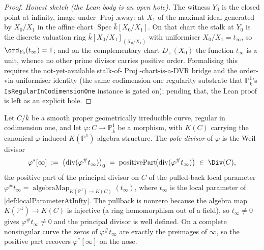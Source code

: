 \begin{proof}
  \emph{Honest sketch (the Lean body is an open hole).} The witness \(Y_0\) is
  the closed point at infinity, image under \(\operatorname{Proj}.\mathrm{aw\!ay\iota}\)
  at \(X_1\) of the maximal ideal generated by \(X_0/X_1\) in the affine chart
  \(\operatorname{Spec} \bar k[X_0/X_1]\). On that chart the stalk at \(Y_0\) is
  the discrete valuation ring \(\bar k[X_0/X_1]_{(X_0/X_1)}\) with uniformiser
  \(X_0/X_1 = t_\infty\), so \(\ord_{Y_0}(t_\infty) = 1\); and on the
  complementary chart \(D_+(X_0)\) the function \(t_\infty\) is a unit, whence
  no other prime divisor carries positive order. Formalising this requires the
  not-yet-available stalk-of-\(\operatorname{Proj}\)-chart-is-a-DVR bridge and
  the order-via-uniformiser identity (the same codimension-one regularity
  substrate that \(\mathbb P^1_{\bar k}\)'s
  \texttt{IsRegularInCodimensionOne} instance is gated on); pending that, the
  Lean proof is left as an explicit hole.
\end{proof}
\begin{definition}
  \label{def:hom_poleDivisor}
  Let \(C / \bar k\) be a smooth proper geometrically irreducible curve, regular
  in codimension one, and let \(\varphi \colon C \to \mathbb P^1_{\bar k}\) be a
  morphism, with \(K(C)\) carrying the canonical \(\varphi\)-induced
  \(K(\mathbb P^1)\)-algebra structure. The \emph{pole divisor} of \(\varphi\)
  is the Weil divisor
  \[
    \varphi^*[\infty]
    \;:=\;
    \bigl(\operatorname{div}(\varphi^\# t_\infty)\bigr)_0
    \;=\;
    \operatorname{positivePart}\!\bigl(\operatorname{div}(\varphi^\# t_\infty)\bigr)
    \;\in\; \Div(C),
  \]
  the positive part of the principal divisor on \(C\) of the pulled-back local
  parameter \(\varphi^\# t_\infty = \operatorname{algebraMap}_{K(\mathbb P^1) \to K(C)}(t_\infty)\),
  where \(t_\infty\) is the local parameter of \cref{def:localParameterAtInfty}.
  The pullback is nonzero because the algebra map \(K(\mathbb P^1) \to K(C)\) is
  injective (a ring homomorphism out of a field), so \(t_\infty \neq 0\) gives
  \(\varphi^\# t_\infty \neq 0\) and the principal divisor is well defined. On a
  complete nonsingular curve the zeros of \(\varphi^\# t_\infty\) are exactly the
  preimages of \(\infty\), so the positive part recovers \(\varphi^*[\infty]\) on
  the nose.
\end{definition}
